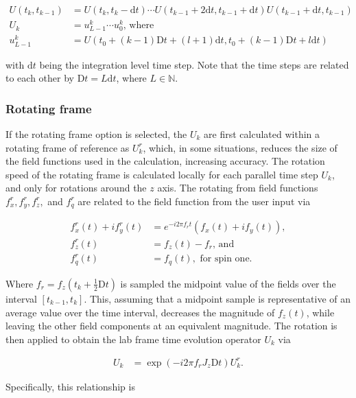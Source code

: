 \documentclass{jors}
\begin{document}
			\begin{align}
				U(t_k, t_{k-1}) &= U(t_k, t_k - \mathrm{d}t) \cdots U(t_{k-1} + 2\mathrm{d}t, t_{k-1} + \mathrm{d}t) U(t_{k-1} + \mathrm{d}t, t_{k-1})\\
				U_k &= u^k_{L-1} \cdots u^k_0\textrm{, where}\\
				u^k_{L-1} &= U(t_0 + (k - 1)\mathrm{D}t + (l + 1)\mathrm{d}t, t_0 + (k - 1)\mathrm{D}t + l\mathrm{d}t)
			\end{align}

			with \(\mathrm{d}t\) being the integration level time step. Note that the time steps are related to each other by \(\mathrm{D}t = L\mathrm{d}t\), where \(L\in\mathbb{N}\).

		\subsubsection{Rotating frame}
			If the rotating frame option is selected, the \(U_k\) are first calculated within a rotating frame of reference as \(U^r_k\), which, in some situations, reduces the size of the field functions used in the calculation, increasing accuracy. The rotation speed of the rotating frame is calculated locally for each parallel time step \(U_k\), and only for rotations around the \(z\) axis. The rotating from field functions \(f^r_x, f^r_y, f^r_z,\) and \(f^r_q\) are related to the field function from the user input via
			
			\begin{align}
				f^r_x(t) + if^r_y(t) &= e^{-i 2\pi f_r t}(f_x(t) + if_y(t)),\\
				f^r_z(t) &= f_z(t) - f_r\textrm{, and}\\
				f^r_q(t) &= f_q(t), \textrm{ for spin one.}
			\end{align}
			
			Where \(f_r = f_z(t_k + \frac12\mathrm{D}t)\) is sampled the midpoint value of the fields over the interval \([t_{k - 1}, t_k]\). This, assuming that a midpoint sample is representative of an average value over the time interval, decreases the magnitude of \(f_z(t)\), while leaving the other field components at an equivalent magnitude. The rotation is then applied to obtain the lab frame time evolution operator \(U_k\) via
			
			\begin{align}
				U_k &= \exp(-i 2 \pi f_r J_z \mathrm{D}t) U^r_k.
			\end{align}

			Specifically, this relationship is
\end{document}
